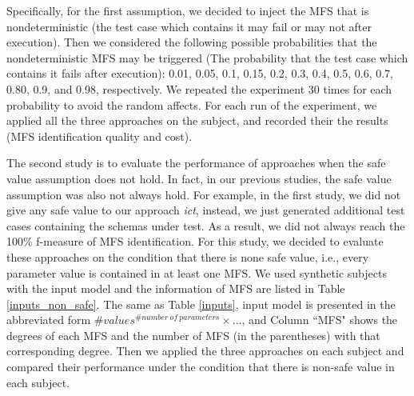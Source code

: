 \documentclass[10pt,journal,compsoc]{IEEEtran}
\begin{document}
Specifically, for the first assumption, we decided to inject {\color{blue} the MFS that is nondeterministic (the test case which contains it may fail or may not after execution).} Then we considered the following possible probabilities that the nondeterministic MFS may be triggered (The probability that the test case which contains it fails after execution): 0.01, 0.05, 0.1, 0.15, 0.2, 0.3, 0.4, 0.5, 0.6, 0.7, 0.80, 0.9, and 0.98, respectively. We repeated the experiment 30 times for each probability to avoid the random affects. For each run of the experiment, we applied all the three approaches on the subject, and recorded their the results (MFS identification quality and cost).

The second study is to evaluate the performance of approaches when the safe value assumption does not hold. In fact, in our previous studies, the safe value assumption was also not always hold. For example, in the first study, we did not give any safe value to our approach \emph{ict}, instead, we just generated additional test cases containing the schemas under test. As a result, we did not always reach the 100\% f-measure of MFS identification. For this study, we decided to evaluate these approaches on the condition that there is none safe value, i.e., every parameter value is contained in at least one MFS. We used synthetic subjects with {\color{blue} the input model and the information of MFS are listed in Table \ref{inputs_non_safe}. The same as Table \ref{inputs}, input model is presented in the abbreviated form $\#values^{\#number\ of\ parameters} \times ...$, and  Column ``MFS" shows the degrees of each MFS and the number of MFS (in the parentheses) with that corresponding degree.} Then we applied the three approaches on each subject and compared their performance under the condition that there is non-safe value in each subject.
\end{document}
